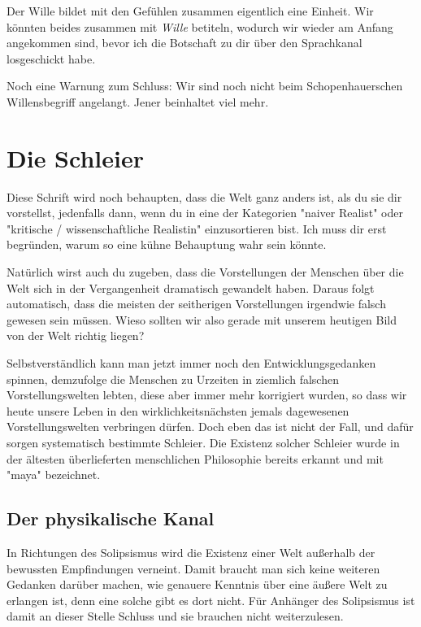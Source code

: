 \documentclass[12pt]{book}
\begin{document}
Der Wille bildet mit den Gefühlen zusammen eigentlich eine Einheit. Wir könnten beides zusammen mit \emph{Wille} betiteln, wodurch wir wieder am Anfang angekommen sind, bevor ich die Botschaft zu dir über den Sprachkanal losgeschickt habe.

Noch eine Warnung zum Schluss: Wir sind noch nicht beim Schopenhauerschen Willensbegriff angelangt. Jener beinhaltet viel mehr.   

\section{Die Schleier}

Diese Schrift wird noch behaupten, dass die Welt ganz anders ist, als du sie dir  vorstellst, jedenfalls dann, wenn du in eine der Kategorien "naiver Realist" oder "kritische / wissenschaftliche Realistin" einzusortieren bist. Ich muss dir erst begründen, warum so eine kühne Behauptung wahr sein könnte.

Natürlich wirst auch du zugeben, dass die Vorstellungen der Menschen über die Welt sich in der Vergangenheit dramatisch gewandelt haben. Daraus folgt automatisch, dass die meisten der seitherigen Vorstellungen irgendwie falsch gewesen sein müssen. Wieso sollten wir also gerade mit unserem heutigen Bild von der Welt richtig liegen?

Selbstverständlich kann man jetzt immer noch den Entwicklungsgedanken spinnen, demzufolge die Menschen zu Urzeiten in ziemlich falschen Vorstellungswelten lebten, diese aber immer mehr korrigiert wurden, so dass wir heute unsere Leben in den wirklichkeitsnächsten jemals dagewesenen Vorstellungswelten verbringen dürfen. Doch eben das ist nicht der Fall, und dafür sorgen systematisch bestimmte Schleier. Die Existenz solcher Schleier wurde in der ältesten überlieferten menschlichen Philosophie bereits erkannt und mit "maya" bezeichnet.

\subsection{Der physikalische Kanal}

In Richtungen des Solipsismus wird die Existenz einer Welt außerhalb der bewussten Empfindungen verneint. Damit braucht man sich keine weiteren Gedanken darüber machen, wie genauere Kenntnis über eine äußere Welt zu erlangen ist, denn eine solche gibt es dort nicht. Für Anhänger des Solipsismus ist damit an dieser Stelle Schluss und sie brauchen nicht weiterzulesen.
\end{document}
